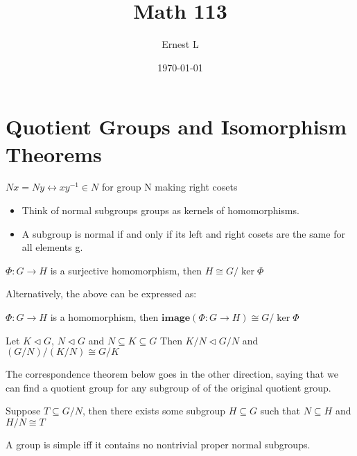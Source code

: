 \documentclass[11pt]{article}
\author{Ernest L}
\date{\today}
\title{Math 113}
\let\biconditional\leftrightarrow
\begin{document}
\maketitle
\section{Quotient Groups and Isomorphism Theorems}

    \begin{theorem}
        $Nx = Ny \biconditional xy^{-1} \in N$ for group N making right cosets
    \end{theorem}

    \begin{itemize}
        \item
        Think of normal subgroups groups as kernels of homomorphisms.
        \item 
        A subgroup is normal if and only if its left and right cosets are the same for all elements g.
    \end{itemize}

    \begin{theorem}
        $\Phi: G \to H$ is a surjective homomorphism, then $H \cong G/\ker \Phi$
    \end{theorem}
    Alternatively, the above can be expressed as:
    \begin{note}
    $\Phi: G \to H$ is a homomorphism, then $\textbf{image} (\Phi: G \to H) \cong G/\ker \Phi$
    \end{note}

    \begin{theorem}
        Let $K \triangleleft G$, $N \triangleleft G$ and $N \subseteq K \subseteq G$
        Then $K/N \triangleleft G/N$ and $(G/N)/(K/N) \cong G/K$
    \end{theorem}

    The correspondence theorem below goes in the other direction, saying that we can find a quotient group for any subgroup of of 
    the original quotient group.
    \begin{theorem}
        Suppose $T \subseteq G / N$, then there exists some subgroup $H \subseteq G$ such that $N \subseteq H$ and $H/N \cong T$
    \end{theorem}

    \begin{definition}
        A group is simple iff it contains no nontrivial proper normal subgroups.
    \end{definition}
    
    
\end{document}
